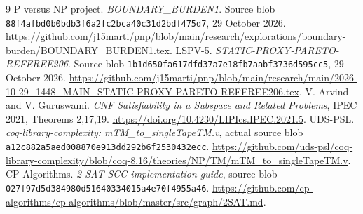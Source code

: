\documentclass[11pt]{article}
\begin{document}
\begin{thebibliography}{9}
 P versus NP project. \emph{BOUNDARY\_BURDEN1}. Source blob \texttt{88f4afbd0b0bdb3f6a2fc2bca40c31d2bdf475d7}, 29 October 2026. \url{https://github.com/j15marti/pnp/blob/main/research/explorations/boundary-burden/BOUNDARY_BURDEN1.tex}.
 LSPV-5. \emph{STATIC-PROXY-PARETO-REFEREE206}. Source blob \texttt{1b1d650fa617dfd37a7e18fb7aabf3736d595cc5}, 29 October 2026. \url{https://github.com/j15marti/pnp/blob/main/research/main/2026-10-29_1448_MAIN_STATIC-PROXY-PARETO-REFEREE206.tex}.
 V. Arvind and V. Guruswami. \emph{CNF Satisfiability in a Subspace and Related Problems}, IPEC 2021, Theorems 2,17,19. \url{https://doi.org/10.4230/LIPIcs.IPEC.2021.5}.
 UDS-PSL. \emph{coq-library-complexity: mTM\_to\_singleTapeTM.v}, actual source blob \texttt{a12c882a5aed008870e913dd292b6f2530432ecc}. \url{https://github.com/uds-psl/coq-library-complexity/blob/coq-8.16/theories/NP/TM/mTM_to_singleTapeTM.v}.
 CP Algorithms. \emph{2-SAT SCC implementation guide}, source blob \texttt{027f97d5d384980d51640334015a4e70f4955a46}. \url{https://github.com/cp-algorithms/cp-algorithms/blob/master/src/graph/2SAT.md}.
\end{thebibliography}
\end{document}
